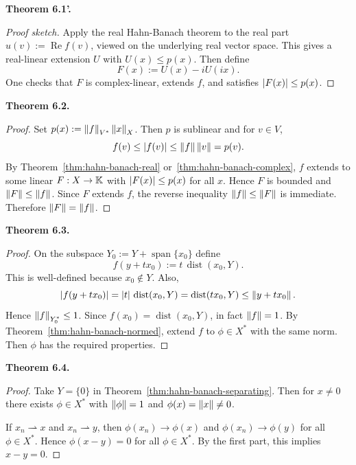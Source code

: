 \documentclass[11pt]{article}
\newenvironment{theoremstmt}[1]{%
  \par\medskip\noindent\textbf{Theorem #1. }\itshape
}{\par\medskip}
\begin{document}
\begin{theoremstmt}{6.1'}
\thmHahnBanachComplex
\end{theoremstmt}

\begin{proof}[Proof sketch]
Apply the real Hahn-Banach theorem to the real part $u(v):=\operatorname{Re}f(v)$, viewed on the underlying real vector space. This gives a real-linear extension $U$ with $U(x)\le p(x)$. Then define
\[
F(x):=U(x)-iU(ix).
\]
One checks that $F$ is complex-linear, extends $f$, and satisfies $\left\lvert F(x)\right\rvert\le p(x)$.
\end{proof}

\begin{theoremstmt}{6.2}
\thmHahnBanachNormed
\end{theoremstmt}

\begin{proof}
Set $p(x):=\left\lVert f\right\rVert_{V^*}\left\lVert x\right\rVert_X$. Then $p$ is sublinear and for $v\in V$,
\[
f(v)\le \left\lvert f(v)\right\rvert\le \left\lVert f\right\rVert\left\lVert v\right\rVert=p(v).
\]
By Theorem~\ref{thm:hahn-banach-real} or~\ref{thm:hahn-banach-complex}, $f$ extends to some linear $F:X\to\mathbb{K}$ with $\left\lvert F(x)\right\rvert\le p(x)$ for all $x$. Hence $F$ is bounded and $\left\lVert F\right\rVert\le \left\lVert f\right\rVert$. Since $F$ extends $f$, the reverse inequality $\left\lVert f\right\rVert\le \left\lVert F\right\rVert$ is immediate. Therefore $\left\lVert F\right\rVert=\left\lVert f\right\rVert$.
\end{proof}

\begin{theoremstmt}{6.3}
\thmHahnBanachSeparating
\end{theoremstmt}

\begin{proof}
On the subspace $Y_0:=Y+\operatorname{span}\{x_0\}$ define
\[
f(y+tx_0):=t\,\operatorname{dist}(x_0,Y).
\]
This is well-defined because $x_0\notin Y$. Also,
\[
\left\lvert f(y+tx_0)\right\rvert=\left\lvert t\right\rvert\,\operatorname{dist}(x_0,Y)
=\operatorname{dist}(tx_0,Y)
\le \left\lVert y+tx_0\right\rVert.
\]
Hence $\left\lVert f\right\rVert_{Y_0^*}\le 1$. Since $f(x_0)=\operatorname{dist}(x_0,Y)$, in fact $\left\lVert f\right\rVert=1$. By Theorem~\ref{thm:hahn-banach-normed}, extend $f$ to $\phi\in X^*$ with the same norm. Then $\phi$ has the required properties.
\end{proof}

\begin{theoremstmt}{6.4}
\thmDualSeparates
\end{theoremstmt}

\begin{proof}
Take $Y=\{0\}$ in Theorem~\ref{thm:hahn-banach-separating}. Then for $x\neq 0$ there exists $\phi\in X^*$ with $\left\lVert \phi\right\rVert=1$ and $\phi(x)=\left\lVert x\right\rVert\neq 0$.

If $x_n\rightharpoonup x$ and $x_n\rightharpoonup y$, then $\phi(x_n)\to \phi(x)$ and $\phi(x_n)\to \phi(y)$ for all $\phi\in X^*$. Hence $\phi(x-y)=0$ for all $\phi\in X^*$. By the first part, this implies $x-y=0$.
\end{proof}
\end{document}
